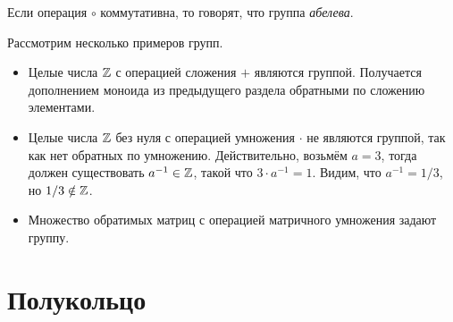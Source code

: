 \begin{definition}
    Если операция $\circ$ коммутативна, то говорят, что группа \emph{абелева}.
\end{definition}

\begin{example}
    Рассмотрим несколько примеров групп.
    \begin{itemize}
        \item Целые числа $\mathbb{Z}$ с операцией сложения $+$ являются группой.
              Получается дополнением моноида из предыдущего раздела обратными по сложению элементами.
        \item Целые числа $\mathbb{Z}$ без нуля%
              с операцией умножения $\cdot$ не являются группой, так как нет обратных по умножению.
              Действительно, возьмём $a = 3$, тогда должен существовать $a^{-1} \in \mathbb{Z}$, такой что $3 \cdot a^{-1} = 1$.
              Видим, что $a^{-1} = 1/3$, но $1/3 \notin \mathbb{Z}$.
        \item Множество обратимых%
              матриц с операцией матричного умножения задают группу.
    \end{itemize}
\end{example}

\section{Полукольцо}

